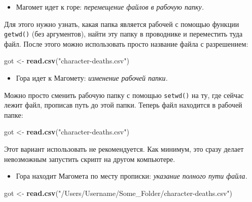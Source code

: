 \documentclass[]{book}
\newenvironment{Shaded}{\begin{snugshade}}{\end{snugshade}}
\newcommand{\KeywordTok}[1]{\textcolor[rgb]{0.13,0.29,0.53}{\textbf{#1}}}
\newcommand{\StringTok}[1]{\textcolor[rgb]{0.31,0.60,0.02}{#1}}
\newcommand{\NormalTok}[1]{#1}
\providecommand{\tightlist}{%
  \setlength{\itemsep}{0pt}\setlength{\parskip}{0pt}}
\begin{document}
\begin{itemize}
\tightlist
\item
  Магомет идет к горе: \emph{перемещение файлов в рабочую папку.}
\end{itemize}

Для этого нужно узнать, какая папка является рабочей с помощью функции
\texttt{getwd()} (без аргументов), найти эту папку в проводнике и
переместить туда файл. После этого можно использовать просто название
файла с разрешением:

\begin{Shaded}
\begin{Highlighting}[]
\NormalTok{got <-}\StringTok{ }\KeywordTok{read.csv}\NormalTok{(}\StringTok{"character-deaths.csv"}\NormalTok{)}
\end{Highlighting}
\end{Shaded}

\begin{itemize}
\tightlist
\item
  Гора идет к Магомету: \emph{изменение рабочей папки.}
\end{itemize}

Можно просто сменить рабочую папку с помощью \texttt{setwd()} на ту, где
сейчас лежит файл, прописав путь до этой папки. Теперь файл находится в
рабочей папке:

\begin{Shaded}
\begin{Highlighting}[]
\NormalTok{got <-}\StringTok{ }\KeywordTok{read.csv}\NormalTok{(}\StringTok{"character-deaths.csv"}\NormalTok{)}
\end{Highlighting}
\end{Shaded}

Этот вариант использовать не рекомендуется. Как минимум, это сразу
делает невозможным запустить скрипт на другом компьютере.

\begin{itemize}
\tightlist
\item
  Гора находит Магомета по месту прописки: \emph{указание полного пути
  файла.}
\end{itemize}

\begin{Shaded}
\begin{Highlighting}[]
\NormalTok{got <-}\StringTok{ }\KeywordTok{read.csv}\NormalTok{(}\StringTok{"/Users/Username/Some_Folder/character-deaths.csv"}\NormalTok{)}
\end{Highlighting}
\end{Shaded}
\end{document}
